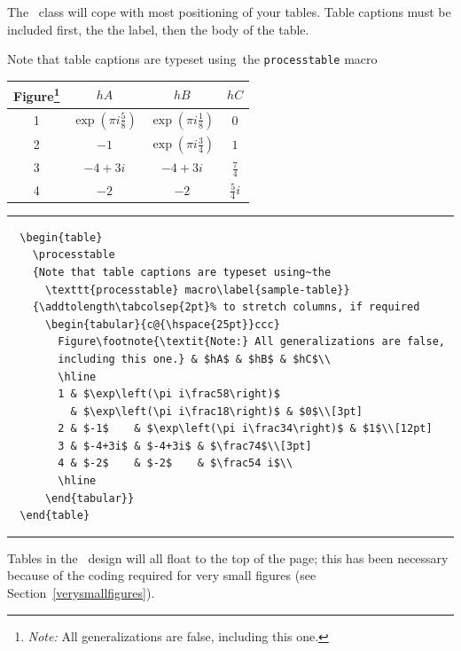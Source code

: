 The \cambridge\ class will cope with most positioning of your tables. Table captions must be included first, the the label, then the body of the table.

  \begin{table}
    \processtable
    {Note that table captions are typeset using~the
      \texttt{processtable} macro\label{sample-table}}
    {\addtolength\tabcolsep{2pt}%
      \begin{tabular}{c@{\hspace{25pt}}ccc}
        Figure\footnote{\textit{Note:} All generalizations are false,
        including this one.} & $hA$ & $hB$ & $hC$\\
        \hline
        1 & $\exp\left(\pi i\frac58\right)$
          & $\exp\left(\pi i\frac18\right)$ & $0$\\[3pt]
        2 & $-1$    & $\exp\left(\pi i\frac34\right)$ & $1$\\[12pt]
        3 & $-4+3i$ & $-4+3i$ & $\frac74$\\[3pt]
        4 & $-2$    & $-2$    & $\frac54 i$\\
        \hline
      \end{tabular}}
  \rule[-20pt]{\textwidth}{0.5pt}
\begin{verbatim}
  \begin{table}
    \processtable
    {Note that table captions are typeset using~the
      \texttt{processtable} macro\label{sample-table}}
    {\addtolength\tabcolsep{2pt}% to stretch columns, if required
      \begin{tabular}{c@{\hspace{25pt}}ccc}
        Figure\footnote{\textit{Note:} All generalizations are false,
        including this one.} & $hA$ & $hB$ & $hC$\\
        \hline
        1 & $\exp\left(\pi i\frac58\right)$
          & $\exp\left(\pi i\frac18\right)$ & $0$\\[3pt]
        2 & $-1$    & $\exp\left(\pi i\frac34\right)$ & $1$\\[12pt]
        3 & $-4+3i$ & $-4+3i$ & $\frac74$\\[3pt]
        4 & $-2$    & $-2$    & $\frac54 i$\\
        \hline
      \end{tabular}}
  \end{table}
\end{verbatim}
  \rule[20pt]{\textwidth}{0.5pt}
  \end{table}
Tables in the \cambridge\ design will all float to the top of the page; this has been necessary because of the coding required for very small figures (see Section~\ref{verysmallfigures}).

